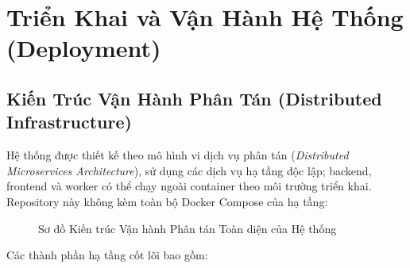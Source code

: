 
\chapter{Triển Khai và Vận Hành Hệ Thống (Deployment)}
\label{chap:deployment}

\section{Kiến Trúc Vận Hành Phân Tán (Distributed Infrastructure)}

Hệ thống được thiết kế theo mô hình vi dịch vụ phân tán (\textit{Distributed Microservices Architecture}), sử dụng các dịch vụ hạ tầng độc lập; backend, frontend và worker có thể chạy ngoài container theo môi trường triển khai. Repository này không kèm toàn bộ Docker Compose của hạ tầng:

\begin{figure}[htbp]
  \centering
  \DrawSystemArchitecture
  \caption{Sơ đồ Kiến trúc Vận hành Phân tán Toàn diện của Hệ thống}
  \label{fig:system_architecture}
\end{figure}

Các thành phần hạ tầng cốt lõi bao gồm:

